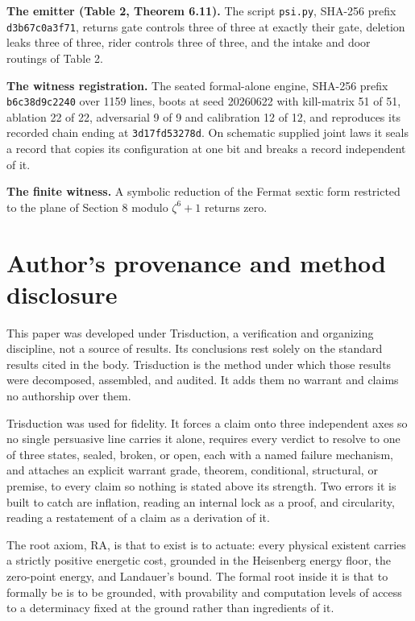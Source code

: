 \documentclass[10pt,twocolumn]{article}
\begin{document}
\textbf{The emitter (Table 2, Theorem 6.11).} The script
\texttt{psi.py}, SHA-256 prefix \texttt{d3b67c0a3f71}, returns gate
controls three of three at exactly their gate, deletion leaks three of
three, rider controls three of three, and the intake and door routings
of Table 2.

\textbf{The witness registration.} The seated formal-alone engine,
SHA-256 prefix \texttt{b6c38d9c2240} over 1159 lines, boots at seed
20260622 with kill-matrix 51 of 51, ablation 22 of 22, adversarial 9 of
9 and calibration 12 of 12, and reproduces its recorded chain ending at
\texttt{3d17fd53278d}. On schematic supplied joint laws it seals a
record that copies its configuration at one bit and breaks a record
independent of it.

\textbf{The finite witness.} A symbolic reduction of the Fermat sextic
form restricted to the plane of Section 8 modulo \(\zeta^6+1\) returns
zero.

\hypertarget{authors-provenance-and-method-disclosure}{%
\section{Author's provenance and method
disclosure}\label{authors-provenance-and-method-disclosure}}

This paper was developed under Trisduction, a verification and
organizing discipline, not a source of results. Its conclusions rest
solely on the standard results cited in the body. Trisduction is the
method under which those results were decomposed, assembled, and
audited. It adds them no warrant and claims no authorship over them.

Trisduction was used for fidelity. It forces a claim onto three
independent axes so no single persuasive line carries it alone, requires
every verdict to resolve to one of three states, sealed, broken, or
open, each with a named failure mechanism, and attaches an explicit
warrant grade, theorem, conditional, structural, or premise, to every
claim so nothing is stated above its strength. Two errors it is built to
catch are inflation, reading an internal lock as a proof, and
circularity, reading a restatement of a claim as a derivation of it.

The root axiom, RA, is that to exist is to actuate: every physical
existent carries a strictly positive energetic cost, grounded in the
Heisenberg energy floor, the zero-point energy, and Landauer's bound.
The formal root inside it is that to formally be is to be grounded, with
provability and computation levels of access to a determinacy fixed at
the ground rather than ingredients of it.
\end{document}
